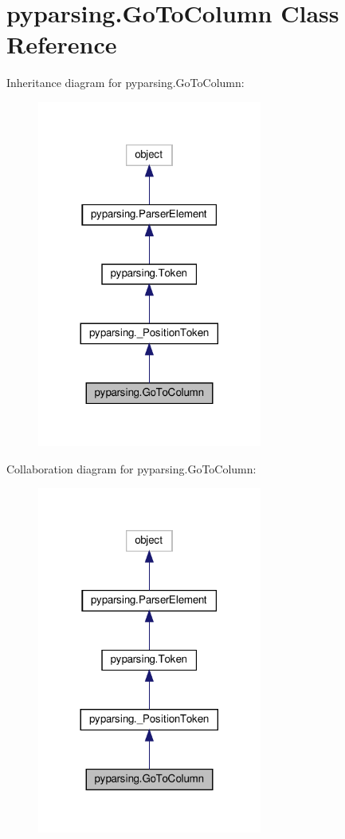 \hypertarget{classpyparsing_1_1GoToColumn}{}\section{pyparsing.\+Go\+To\+Column Class Reference}
\label{classpyparsing_1_1GoToColumn}


Inheritance diagram for pyparsing.\+Go\+To\+Column\+:
\nopagebreak
\begin{figure}[H]
\begin{center}
\leavevmode
\includegraphics[width=209pt]{classpyparsing_1_1GoToColumn__inherit__graph}
\end{center}
\end{figure}


Collaboration diagram for pyparsing.\+Go\+To\+Column\+:
\nopagebreak
\begin{figure}[H]
\begin{center}
\leavevmode
\includegraphics[width=209pt]{classpyparsing_1_1GoToColumn__coll__graph}
\end{center}
\end{figure}

